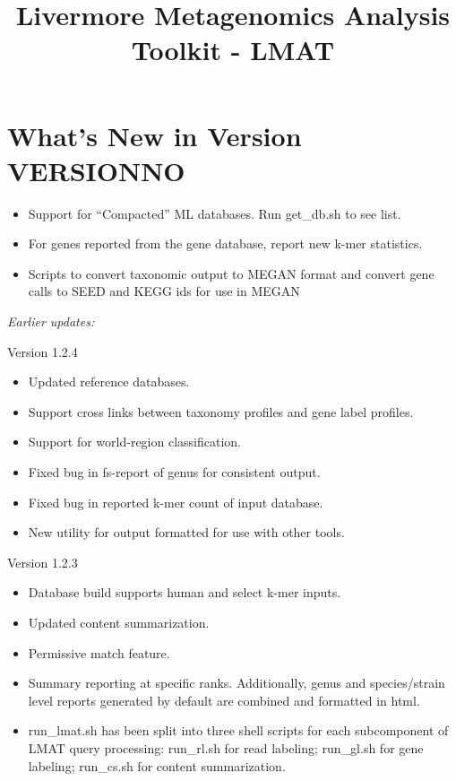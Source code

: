 \documentclass[11pt]{article}
\title{Livermore Metagenomics Analysis Toolkit - LMAT}
\newcommand{\lmatver}{VERSIONNO}
\begin{document}
\maketitle
\tableofcontents

\section{What's New in Version \lmatver}


\begin{itemize}
\item
Support for ``Compacted'' ML databases.  Run get\_db.sh to see list.
\item
For genes reported from the gene database, report new k-mer statistics.
\item
Scripts to convert taxonomic output to MEGAN format and convert gene calls to SEED and KEGG ids for use in MEGAN

\end{itemize}


{\it Earlier updates:}


Version 1.2.4

\begin{itemize}
\item
Updated reference databases.
\item
Support cross links between taxonomy profiles and gene label profiles.

\item
Support for world-region classification.
\item
Fixed bug in fs-report of genus for consistent output.

\item
Fixed bug in reported k-mer count of input database.
\item
New utility for output formatted for use with other tools.

\end{itemize}


Version 1.2.3

\begin{itemize}
\item 
Database build supports human and select k-mer inputs.
\item 
Updated content summarization.
\item
Permissive match feature.
\item
Summary reporting at specific ranks.  Additionally, genus and species/strain level reports generated by default are combined and formatted in html.
\item
run\_lmat.sh has been split into three shell scripts for each subcomponent of LMAT query processing:  run\_rl.sh for read labeling;  run\_gl.sh for gene labeling;  run\_cs.sh for content summarization.



\end{itemize}
\end{document}

